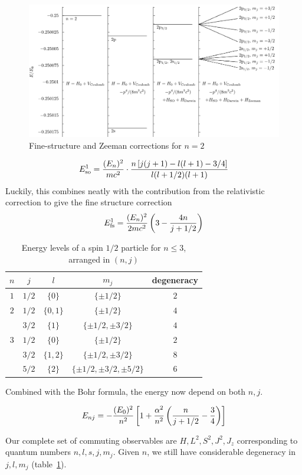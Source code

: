 \begin{figure}[h!] %
    \centering
    \includegraphics[width=1\linewidth]{src/n=2_hydrogen_fs.png}
    \caption{Fine-structure and Zeeman corrections for $n=2$}
    \label{fig:fs_zeeman}
\end{figure}
\begin{equation}
    E^1_{\mathrm{so}}=\dfrac{(E_n)^2}{mc^2}\cdot \dfrac{n\left[j(j+1)-l(l+1)-3/4\right]}{l(l+1/2)(l+1)}
\end{equation}
Luckily, this combines neatly with the contribution from the 
relativistic correction to give the fine structure correction 
\begin{equation}
    E^1_{\mathrm{fs}}=\dfrac{(E_n)^2}{2mc^2}\left(3-\dfrac{4n}{j+1/2}\right)
\end{equation}
\begin{table}[h!]
    \centering
    \begin{tabular}{|c|c|c|c|c|}
    \hline
    $n$ & $j$ & $l$ & $m_j$ & degeneracy \\ 
    \hline
    $1$ & $1/2$ & $\{0\}$ & $\{\pm 1/2\}$ & $2$ \\
    $2$ & $1/2$ & $\{0, 1\}$ & $\{\pm1/2\}$ & $4$ \\
        & $3/2$ & $\{1\}$    & $\{\pm1/2, \pm 3/2\}$ & $4$ \\
    $3$ & $1/2$ & $\{0\}$  & $\{\pm 1/2\}$ & $2$ \\
        & $3/2$ & $\{1, 2\}$ & $\{\pm 1/2, \pm3/2\}$ & $8$ \\
        & $5/2$ & $\{2\}$ & $\{\pm 1/2, \pm 3/2, \pm5/2\}$ & $6$ \\
    \hline
    \end{tabular}
    \caption{Energy levels of a spin $1/2$ particle for $n\leq 3$, arranged in $(n, j)$
    \label{tbl:hydrogen_fs}}
\end{table}
Combined with the Bohr formula, the energy now depend on both $n, j$. 
\begin{mdframed}
\begin{equation}\label{eqn:fs_energy_level}
    E_{nj} = -\dfrac{(E_0)^2}{n^2}\left[1 + \dfrac{\alpha^2}{n^2}\left(\dfrac{n}{j+1/2} - \dfrac 3 4\right)\right]
\end{equation}
\end{mdframed}
Our complete set of commuting observables are $H, L^2, S^2, J^2, J_z$ 
corresponding to quantum numbers $n, l, s, j, m_j$. 
Given $n$, we still have considerable degeneracy in $j, l, m_j$ (table~\ref{tbl:hydrogen_fs}).

